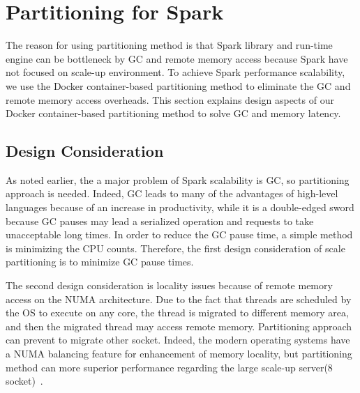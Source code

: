 \section{Partitioning for Spark}

The reason for using partitioning method is that
Spark library and run-time engine can be bottleneck by GC and remote memory access 
because Spark have not focused on scale-up environment.
To achieve Spark performance scalability, we use the Docker container-based
partitioning method to eliminate the GC and remote memory access overheads. 
This section explains design aspects of our Docker container-based
partitioning method to solve GC and memory latency.

\subsection{Design Consideration}

As noted earlier, the a major problem of Spark scalability is
GC, so partitioning approach is needed.
Indeed, GC leads to many of the advantages of high-level languages because of
an increase in productivity, while it is a double-edged sword because
GC pauses may lead a serialized operation and requests to take unacceptable long
times.
In order to reduce the GC pause time, a simple method is minimizing the CPU counts.
Therefore, the first design consideration of scale partitioning is to minimize GC
pause times.

The second design consideration is locality issues because of
remote memory access on the NUMA architecture.
Due to the fact that threads are scheduled by the OS to execute on any core, the
thread is migrated to different memory area, and then the migrated thread may access
remote memory.
Partitioning approach can prevent to migrate other socket.
Indeed, the modern operating systems have a NUMA balancing feature for
enhancement of memory locality, but partitioning method can more superior
performance regarding the large scale-up server(8 socket)~\cite{AutoNUMA}.

